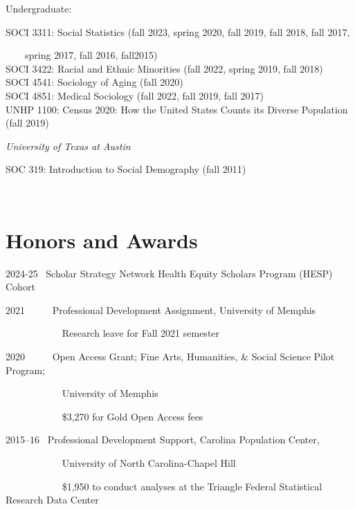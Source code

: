 \documentclass[11pt,]{article}
\begin{document}
\setlength{\leftskip}{0cm}

\setlength{\leftskip}{0.5cm}

Undergraduate:

\setlength{\leftskip}{0cm}
\setlength{\leftskip}{1cm}

SOCI 3311: Social Statistics (fall 2023, spring 2020, fall 2019, fall
2018, fall 2017,\\
\strut ~~~~spring 2017, fall 2016, fall2015)\\
SOCI 3422: Racial and Ethnic Minorities (fall 2022, spring 2019, fall
2018)\\
SOCI 4541: Sociology of Aging (fall 2020)\\
SOCI 4851: Medical Sociology (fall 2022, fall 2019, fall 2017)\\
UNHP 1100: Census 2020: How the United States Counts its Diverse
Population (fall 2019)

\setlength{\leftskip}{0cm}

\emph{University of Texas at Austin}

\setlength{\leftskip}{1cm}

SOC 319: Introduction to Social Demography (fall 2011)

\setlength{\leftskip}{0cm}

~

\section{Honors and Awards}\label{honors-and-awards}

2024-25 ~Scholar Strategy Network Health Equity Scholars Program (HESP)
Cohort

2021 ~ ~ ~ Professional Development Assignment, University of Memphis\\
\strut ~ ~ ~ ~ ~ ~ ~ Research leave for Fall 2021 semester

2020 ~ ~ ~ Open Access Grant; Fine Arts, Humanities, \& Social Science
Pilot Program;\\
\strut ~ ~ ~ ~ ~ ~ ~ University of Memphis\\
\strut ~ ~ ~ ~ ~ ~ ~ \$3,270 for Gold Open Access fees

2015--16 ~Professional Development Support, Carolina Population
Center,\\
\strut ~ ~ ~ ~ ~ ~ ~ University of North Carolina-Chapel Hill\\
\strut ~ ~ ~ ~ ~ ~ ~ \$1,950 to conduct analyses at the Triangle Federal
Statistical Research Data Center
\end{document}
